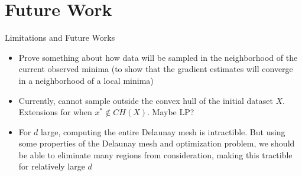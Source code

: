 \documentclass[xcolor=dvipsnames]{beamer}
\begin{document}
\section{Future Work}
\begin{frame}{Limitations and Future Works}
\begin{itemize}
\item Prove something about how data will be sampled in the neighborhood of
the current observed minima (to show that the gradient estimates will converge
in a neighborhood of a local minima)
\item Currently, cannot sample outside the convex hull of the initial dataset
$X$. Extensions for when $x^* \not\in CH(X)$. Maybe LP?
\item For $d$ large, computing the entire Delaunay mesh is intractible.
But using some properties of the Delaunay mesh and optimization problem,
we should be able to eliminate many regions from consideration, making this
tractible for relatively large $d$
\end{itemize}
\end{frame}
\begin{frame}
\end{frame}
\end{document}
